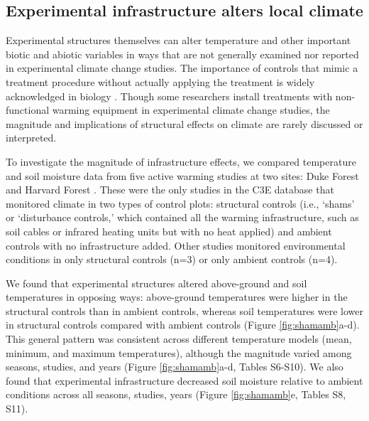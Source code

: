 \documentclass{article}
\begin{document}
\subsection* {Experimental infrastructure alters local climate}
Experimental structures themselves can alter temperature and other important biotic and abiotic variables in ways that are not generally examined nor reported in experimental climate change studies. The importance of controls that mimic a treatment procedure without actually applying the treatment is widely acknowledged in biology \citep[e.g.,][]{spector2001,johnson2002,quinn2002}. Though some researchers install treatments with non-functional warming equipment in experimental climate change studies, the magnitude and implications of structural effects on climate are rarely discussed or interpreted.
\par To investigate the magnitude of infrastructure effects, we compared temperature and soil moisture data from five active warming studies at two sites: Duke Forest and Harvard Forest \citep{farnsworth1995,clark2014b, marchin2015, pelini2011}. These were the only studies in the C3E database that monitored climate in two types of control plots: structural controls (i.e., `shams' or `disturbance controls,' which contained all the warming infrastructure, such as soil cables or infrared heating units but with no heat applied) and ambient controls with no infrastructure added. Other studies monitored environmental conditions in only structural controls (n=3) or only ambient controls (n=4).

\par We found that experimental structures altered above-ground and soil temperatures in opposing ways: above-ground temperatures were higher in the structural controls than in ambient controls, whereas soil temperatures were lower in structural controls compared with ambient controls (Figure \ref{fig:shamamb}a-d). This general pattern was consistent across different temperature models (mean, minimum, and maximum temperatures), although the magnitude varied among seasons, studies, and years (Figure \ref{fig:shamamb}a-d, Tables S6-S10). We also found that experimental infrastructure decreased soil moisture relative to ambient conditions across all seasons, studies, years (Figure \ref{fig:shamamb}e, Tables S8, S11). 
\end{document}
